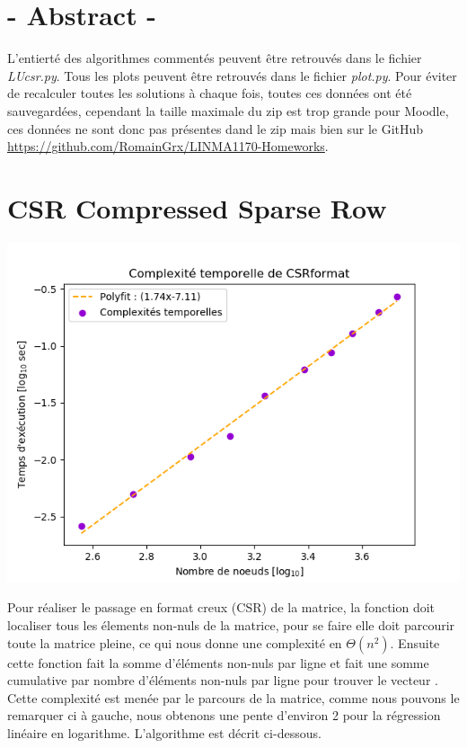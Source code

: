 \documentclass{article}[11pt]
\begin{document}
\mytitle
\section*{- Abstract -}
L'entierté des algorithmes commentés peuvent être retrouvés dans le fichier \textit{LUcsr.py}. Tous les plots peuvent être retrouvés dans le fichier \textit{plot.py}. Pour éviter de recalculer toutes les solutions à chaque fois, toutes ces données ont été sauvegardées, cependant la taille maximale du zip est trop grande pour Moodle, ces données ne sont donc pas présentes dand le zip mais bien sur le GitHub \url{https://github.com/RomainGrx/LINMA1170-Homeworks}.
\section{CSR \lbrack Compressed Sparse Row\rbrack} %
\label{sec:CSR}

\begin{minipage}{0.5\textwidth}
\label{fig:CSR}
\includegraphics[width=\textwidth]{res/plots/CSR.png}
\end{minipage}
\begin{minipage}{0.5\textwidth}
Pour réaliser le passage en format creux (CSR) de la matrice, la fonction  doit localiser tous les élements non-nuls de la matrice, pour se faire elle doit parcourir toute la matrice pleine, ce qui nous donne une complexité en $\Theta(n^2)$. Ensuite cette fonction fait la somme d'éléments non-nuls par ligne et fait une somme cumulative par nombre d'éléments non-nuls par ligne pour trouver le vecteur . Cette complexité est menée par le parcours de la matrice, comme nous pouvons le remarquer ci à gauche, nous obtenons une pente d'environ 2 pour la régression linéaire en logarithme. L'algorithme est décrit ci-dessous.
\end{minipage}

\end{document}
